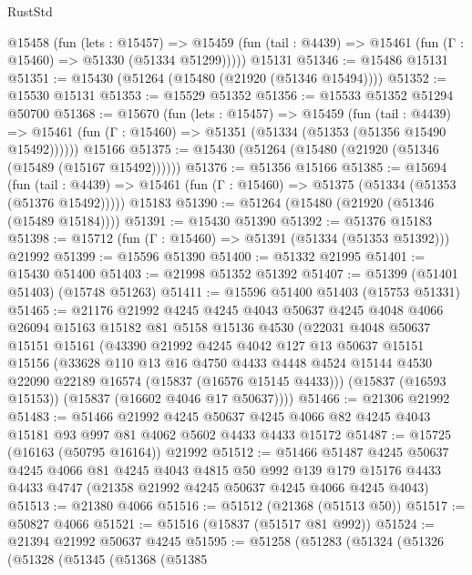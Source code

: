 \begin{lexlean}{RustStd}
\begin{coremodule}
    @15458
      (fun (lets : @15457) =>
      @15459 (fun (tail : @4439) => @15461 (fun (Γ : @15460) => @51330 (@51334 @51299)))))
    @15131
@51346 := @15486 @15131
@51351 := @15430 (@51264 (@15480 (@21920 (@51346 @15494))))
@51352 := @15530 @15131
@51353 := @15529 @51352
@51356 := @15533 @51352 @51294 @50700
@51368 := @15670
    (fun (lets : @15457) =>
    @15459
      (fun (tail : @4439) =>
      @15461 (fun (Γ : @15460) => @51351 (@51334 (@51353 (@51356 @15490 @15492))))))
    @15166
@51375 := @15430 (@51264 (@15480 (@21920 (@51346 (@15489 (@15167 @15492))))))
@51376 := @51356 @15166
@51385 := @15694
    (fun (tail : @4439) => @15461 (fun (Γ : @15460) => @51375 (@51334 (@51353 (@51376 @15492)))))
    @15183
@51390 := @51264 (@15480 (@21920 (@51346 (@15489 @15184))))
@51391 := @15430 @51390
@51392 := @51376 @15183
@51398 := @15712 (fun (Γ : @15460) => @51391 (@51334 (@51353 @51392))) @21992
@51399 := @15596 @51390
@51400 := @51332 @21995
@51401 := @15430 @51400
@51403 := @21998 @51352 @51392
@51407 := @51399 (@51401 @51403) (@15748 @51263)
@51411 := @15596 @51400 @51403 (@15753 @51331)
@51465 := @21176
    @21992
    @4245
    @4245
    @4043
    @50637
    @4245
    @4048
    @4066
    @26094
    @15163
    @15182
    @81
    @5158
    @15136
    @4530
    (@22031
      @4048
      @50637
      @15151
      @15161
      (@43390
        @21992
        @4245
        @4042
        @127
        @13
        @50637
        @15151
        @15156
        (@33628
          @110
          @13
          @16
          @4750
          @4433
          @4448
          @4524
          @15144
          @4530
          @22090
          @22189
          @16574
          (@15837 (@16576 @15145 @4433)))
        (@15837 (@16593 @15153))
        (@15837 (@16602 @4046 @17 @50637))))
@51466 := @21306 @21992
@51483 := @51466
    @21992
    @4245
    @50637
    @4245
    @4066
    @82
    @4245
    @4043
    @15181
    @93
    @997
    @81
    @4062
    @5602
    @4433
    @4433
    @15172
@51487 := @15725 (@16163 (@50795 @16164)) @21992
@51512 := @51466
    @51487
    @4245
    @50637
    @4245
    @4066
    @81
    @4245
    @4043
    @4815
    @50
    @992
    @139
    @179
    @15176
    @4433
    @4433
    @4747
    (@21358 @21992 @4245 @50637 @4245 @4066 @4245 @4043)
@51513 := @21380 @4066
@51516 := @51512 (@21368 (@51513 @50))
@51517 := @50827 @4066
@51521 := @51516 (@15837 (@51517 @81 @992))
@51524 := @21394 @21992 @50637 @4245
@51595 := @51258
    (@51283
      (@51324
        (@51326
          (@51328
            (@51345
              (@51368
                (@51385

\end{coremodule}
\end{lexlean}
